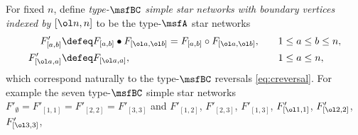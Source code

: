 For fixed $n$, define {\em type-$\msfBC$ simple star networks
  with boundary vertices indexed by $[\ol n, n]$} to be the
type-$\msfA$ star networks
\begin{equation}\label{eq:bcstardef}
  \begin{alignedat}{2}
    F'_{[a,b]} &\defeq F_{[a,b]} \bullet F_{[\ol a, \ol b]}
    = F_{[a,b]} \circ F_{[\ol a, \ol b]},
    &\qquad &1 \leq a \leq b \leq n, \\ 
    F'_{[\ol a, a]} &\defeq F_{[\ol a, a]},
    &\qquad &1 \leq a \leq n,
    \end{alignedat}
\end{equation}
which correspond naturally to the type-$\msfBC$ reversals \eqref{eq:creversal}.
For example the seven type-$\msfBC$
simple star networks
$F'_{\emptyset} = F'_{[1,1]} = F'_{[2,2]} = F'_{[3,3]}$ and $F'_{[1,2]}$,
$F'_{[2,3]}$, $F'_{[1,3]}$, $F'_{\smash{[\ol 1, 1]}}$, $F'_{\smash{[\ol 2, 2]}}$,
$F'_{\smash{[\ol 3, 3]}}$,
